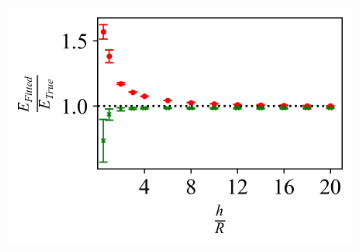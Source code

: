 \begin{figure}[H]
\begin{subfigure}[t]{0.32\textwidth}
    \end{subfigure}
    \hfill
   \begin{subfigure}[t]{0.32\textwidth}
        \centering
        \caption{\label{fig: Sphere-Plane-Young's_Modulus} }
        \includegraphics[width=1\linewidth]{Figures/Sphere-Plane-Youngs_Modulus.png}
    \end{subfigure} 

    
    \hfill
    \vspace{-0.4in}
    

\end{figure}
